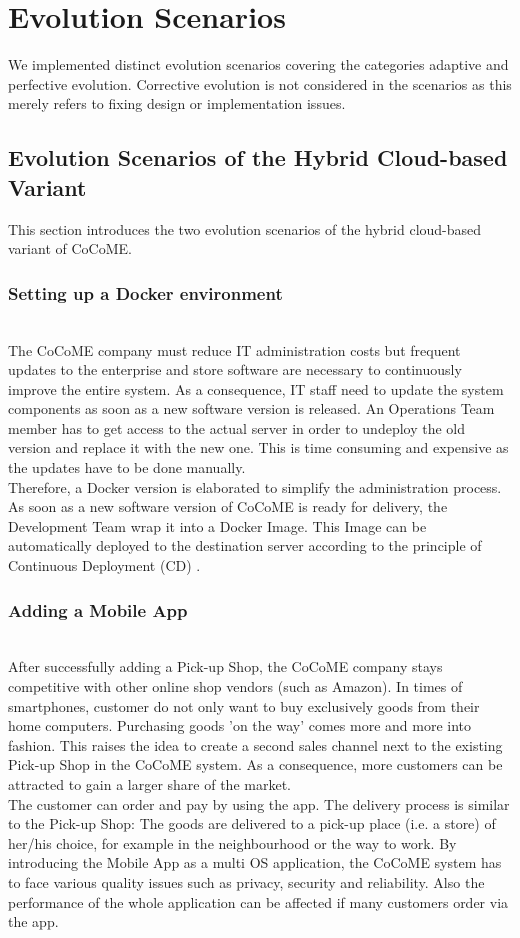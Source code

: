 \section{Evolution Scenarios}
We implemented distinct evolution scenarios covering the categories adaptive and perfective
evolution. Corrective evolution is not considered in the scenarios as this merely refers to fixing design or implementation issues.

\subsection{Evolution Scenarios of the Hybrid Cloud-based Variant}
This section introduces the two evolution scenarios of the hybrid cloud-based variant of
CoCoME.
\subsubsection{Setting up a Docker environment}
~\\The CoCoME company must reduce IT administration costs but frequent updates to the enterprise and store software are necessary to continuously improve the entire system. As a consequence, IT staff need to update the system components as soon as a new software version is released. An Operations Team member has to get access to the actual server in order to undeploy the old version and replace it with the new one. This is time consuming and expensive as the updates have to be done manually.\\
Therefore, a Docker version is elaborated to simplify the administration process. As soon as a new software version of CoCoME is ready for delivery, the Development Team wrap it into a Docker Image. This Image can be automatically deployed to the destination server according to the principle of Continuous Deployment (CD) \cite{olsson2012climbing}. 




\subsubsection{Adding a Mobile App}
~\\After successfully adding a Pick-up Shop, the CoCoME company stays competitive with other online shop vendors (such as Amazon). In times of smartphones, customer do not only want to buy exclusively goods from their home computers. Purchasing goods 'on the way' comes more and more into fashion. This raises the idea to create a second sales channel next to the existing Pick-up Shop in the CoCoME system. As a consequence, more customers can be attracted to gain a larger share of the market. 
\\
The customer can order and pay by using the app. The delivery process is similar to the Pick-up Shop: The goods are delivered to a pick-up place (i.e. a store) of her/his choice, for example in the neighbourhood or the way to work.
By introducing the Mobile App as a multi OS application, the CoCoME system has to face various quality issues such as privacy, security and reliability. Also the performance of the whole application can be affected if many customers order via the app.




